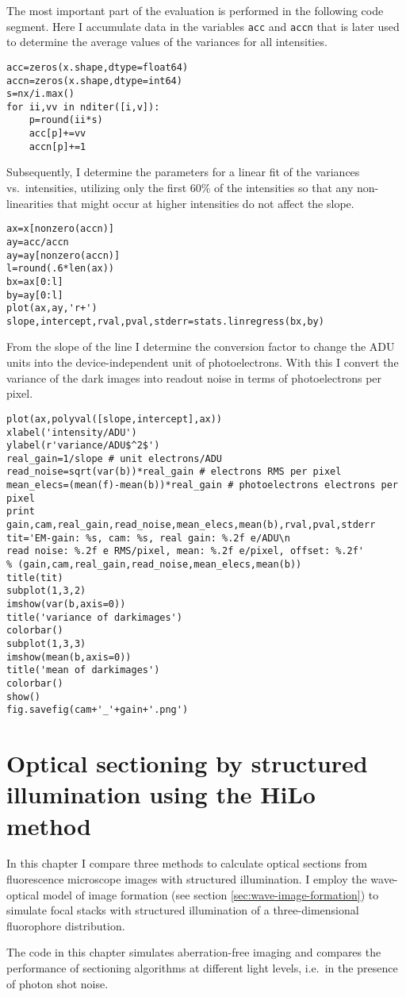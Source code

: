 The most important part of the evaluation is performed in the
following code segment. Here I accumulate data in the variables
\verb!acc! and \verb!accn! that is later used to determine the average
values of the variances for all intensities.
\begin{lstlisting}[style=mypython]
acc=zeros(x.shape,dtype=float64)
accn=zeros(x.shape,dtype=int64)
s=nx/i.max()
for ii,vv in nditer([i,v]):
    p=round(ii*s)
    acc[p]+=vv
    accn[p]+=1   
\end{lstlisting}
Subsequently, I determine the parameters for a linear fit of the
variances vs.\ intensities, utilizing only the first 60\% of the
intensities so that any non-linearities that might occur at higher
intensities do not affect the slope.
\begin{lstlisting}[style=mypython]
ax=x[nonzero(accn)]
ay=acc/accn
ay=ay[nonzero(accn)]
l=round(.6*len(ax))
bx=ax[0:l]
by=ay[0:l]
plot(ax,ay,'r+')
slope,intercept,rval,pval,stderr=stats.linregress(bx,by)
\end{lstlisting}
From the slope of the line I determine the conversion factor to change
the ADU units into the device-independent unit of photoelectrons. With
this I convert the variance of the dark images into readout noise in
terms of photoelectrons per pixel.
\begin{lstlisting}[style=mypython]
plot(ax,polyval([slope,intercept],ax))
xlabel('intensity/ADU')
ylabel(r'variance/ADU$^2$')
real_gain=1/slope # unit electrons/ADU
read_noise=sqrt(var(b))*real_gain # electrons RMS per pixel
mean_elecs=(mean(f)-mean(b))*real_gain # photoelectrons electrons per pixel
print gain,cam,real_gain,read_noise,mean_elecs,mean(b),rval,pval,stderr
tit='EM-gain: %s, cam: %s, real gain: %.2f e/ADU\n
read noise: %.2f e RMS/pixel, mean: %.2f e/pixel, offset: %.2f'
% (gain,cam,real_gain,read_noise,mean_elecs,mean(b))
title(tit)
subplot(1,3,2)
imshow(var(b,axis=0))
title('variance of darkimages')
colorbar()
subplot(1,3,3)
imshow(mean(b,axis=0))
title('mean of darkimages')
colorbar()
show()
fig.savefig(cam+'_'+gain+'.png')
\end{lstlisting}


\chapter{Optical sectioning by structured illumination using the HiLo method}
\label{sec:sectioning}
\begin{summary}
  In this chapter I compare three methods to calculate optical
  sections from fluorescence microscope images with structured
  illumination. I employ the wave-optical model of image formation
  (see section \ref{sec:wave-image-formation}) to simulate focal
  stacks with structured illumination of a three-dimensional
  fluorophore distribution. 

  The code in this chapter simulates aberration-free imaging and
  compares the performance of sectioning algorithms at different light
  levels, i.e.\ in the presence of photon shot noise.
\end{summary}


